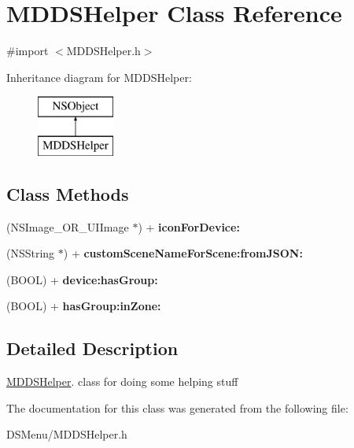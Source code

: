 \hypertarget{interface_m_d_d_s_helper}{\section{M\-D\-D\-S\-Helper Class Reference}
\label{interface_m_d_d_s_helper}
}


{\ttfamily \#import $<$M\-D\-D\-S\-Helper.\-h$>$}

Inheritance diagram for M\-D\-D\-S\-Helper\-:\begin{figure}[H]
\begin{center}
\leavevmode
\includegraphics[height=2.000000cm]{interface_m_d_d_s_helper}
\end{center}
\end{figure}
\subsection*{Class Methods}
\begin{DoxyCompactItemize}
\item 
\hypertarget{interface_m_d_d_s_helper_a65d48c0beaae7df4f56249f748f8cefd}{(N\-S\-Image\-\_\-\-O\-R\-\_\-\-U\-I\-Image $\ast$) + {\bfseries icon\-For\-Device\-:}}\label{interface_m_d_d_s_helper_a65d48c0beaae7df4f56249f748f8cefd}

\item 
\hypertarget{interface_m_d_d_s_helper_ad7a3c10995dc96733a6ac86b30de6f2d}{(N\-S\-String $\ast$) + {\bfseries custom\-Scene\-Name\-For\-Scene\-:from\-J\-S\-O\-N\-:}}\label{interface_m_d_d_s_helper_ad7a3c10995dc96733a6ac86b30de6f2d}

\item 
\hypertarget{interface_m_d_d_s_helper_a81f16075bd0ff53c55472f89ed35f994}{(B\-O\-O\-L) + {\bfseries device\-:has\-Group\-:}}\label{interface_m_d_d_s_helper_a81f16075bd0ff53c55472f89ed35f994}

\item 
\hypertarget{interface_m_d_d_s_helper_aaea456daff4bdf1ce9f46850579d172e}{(B\-O\-O\-L) + {\bfseries has\-Group\-:in\-Zone\-:}}\label{interface_m_d_d_s_helper_aaea456daff4bdf1ce9f46850579d172e}

\end{DoxyCompactItemize}


\subsection{Detailed Description}
\hyperlink{interface_m_d_d_s_helper}{M\-D\-D\-S\-Helper}. class for doing some helping stuff 

The documentation for this class was generated from the following file\-:\begin{DoxyCompactItemize}
\item 
D\-S\-Menu/M\-D\-D\-S\-Helper.\-h\end{DoxyCompactItemize}
